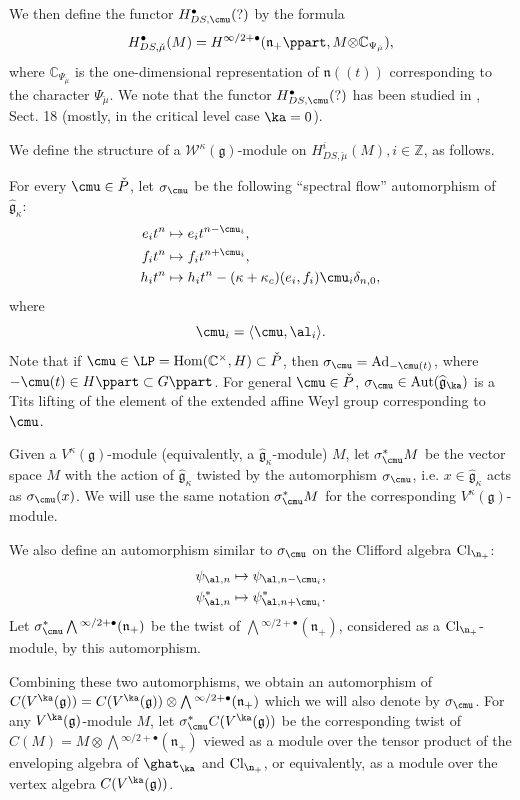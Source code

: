\documentclass{amsart}
\newcommand{\on}{\operatorname}
\newcommand{\+}{\mathop{\oplus}}
\renewcommand{\*}{{\otimes}}
\newcommand{\mf}{\mathfrak}
\newcommand{\g}{\mf{g}}
\newcommand{\affg}{\widehat{\mf{g}}}
\newcommand{\Z}{\mathbb{Z}}
\newcommand{\C}{\mathbb{C}}
\newcommand{\W}{\mathscr{W}}
\theoremstyle{theorem}
\theoremstyle{remark}
\numberwithin{equation}{section}
\begin{document}
We then define the functor $H^\bullet_{DS,\cmu}(?)$ by the formula
\begin{align*}
H_{DS,\check{\mu}}^\bullet(M)=H^{\infty/2+\bullet}(\mf{n}_+\ppart, M\*
\C_{\Psi_{\check{\mu}}}),
\end{align*}
where $\C_{\Psi_{\check{\mu}}}$ is the one-dimensional representation
of $\mf{n}((t))$ corresponding to the character $\Psi_{\check{\mu}}$.
We note that the functor $H^\bullet_{DS,\cmu}(?)$ has been studied in
\cite{FG}, Sect. 18 (mostly, in the critical level case $\ka=0$).

We define the structure of a $\W^\kappa(\g)$-module on
$H_{DS,\check{\mu}}^i(M), i \in \Z$, as follows.

For every $\cmu\in \check{P}$, let $\sigma_{\cmu}$ be the following
``spectral flow'' automorphism of $\affg_{\kappa}$:
\begin{align*}
e_i t^n &\mapsto e_i t^{n-\cmu_i}, \\
f_i t^n &\mapsto f_i t^{n+\cmu_i}, \\
h_i t^n &\mapsto h_i t^n - (\kappa+\kappa_c)(e_i,f_i) \cmu_i
\delta_{n,0},
\end{align*}
where
$$
\cmu_i = \langle \cmu,\al_i \rangle.
$$
Note that if $\cmu \in \LP = \on{Hom}(\C^\times,H) \subset \check{P}$,
then $\sigma_\cmu = \on{Ad}_{-\cmu(t)}$, where $-\cmu(t) \in H\ppart
\subset G\ppart$. For general $\cmu \in \check{P}$, $\sigma_\cmu \in
\on{Aut}(\affg_\ka)$ is a Tits lifting of the element of the extended
affine Weyl group corresponding to $\cmu$.

Given a $V^\kappa(\g)$-module (equivalently, a
$\affg_{\kappa}$-module) $M$, let $\sigma^*_\cmu M$ be the vector space
$M$ with the action of $\affg_{\kappa}$ twisted by the
automorphism $\sigma_{\cmu}$, i.e. $x \in \affg_{\kappa}$ acts as
$\sigma_\cmu(x)$. We will use the same notation
$\sigma^*_\cmu M$ for the corresponding $V^\kappa(\g)$-module.

We also define an automorphism similar to $\sigma_\cmu$ on the
Clifford algebra $\on{Cl}_{\n_+}$:
\begin{align*}
\psi_{\al,n} &\mapsto \psi_{\al,n-\cmu_i}, \\
\psi^*_{\al,n} &\mapsto \psi^*_{\al,n+\cmu_i}.
\end{align*}
Let $\sigma^*_\cmu \bigwedge{}^{\infty/2+\bullet}(\mf{n}_+)$ be the
twist of $\bigwedge{}^{\infty/2+\bullet}(\mf{n}_+)$, considered as a
$\on{Cl}_{\n_+}$-module, by this automorphism.

Combining these two automorphisms, we obtain an automorphism of
$C(V^\ka(\g)) = C(V^\ka(\g)) \otimes
\bigwedge{}^{\infty/2+\bullet}(\mf{n}_+)$ which we will also denote by
$\sigma_\cmu$. For any $V^\ka(\g)$-module $M$, let $\sigma^*_\cmu
C(V^\ka(\g))$ be the corresponding twist of $C(M) = M \otimes
\bigwedge{}^{\infty/2+\bullet}(\mf{n}_+)$ viewed as a module over the
tensor product of the enveloping algebra of $\ghat_\ka$ and
$\on{Cl}_{\n_+}$, or equivalently, as a module over the vertex algebra
$C(V^\ka(\g))$.
\end{document}
